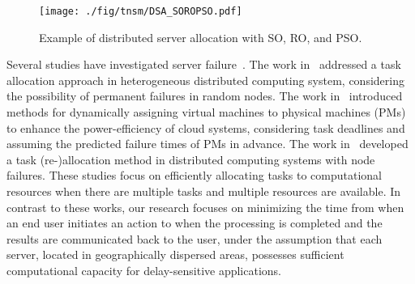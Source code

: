 \documentclass[10pt, letterpaper]{IEEEtran}
\begin{document}
\begin{CJK}{UTF8}{ipxm}
\begin{figure}[tb]
  \begin{center}
      \texttt{[image: ./fig/tnsm/DSA\_SOROPSO.pdf]}
  \end{center}
  \caption{Example of distributed server allocation with SO, RO, and PSO.}
  \label{fig:DSA_SOROPSO}
\end{figure}

Several studies have investigated server failure~\cite{ImanakaTNSM27,ImanakaTNSM28,ImanakaTNSM29}.
The work in~\cite{ImanakaTNSM27} addressed a task allocation approach in heterogeneous distributed computing system, considering the possibility of permanent failures in random nodes.
The work in~\cite{ImanakaTNSM28} introduced methods for dynamically assigning virtual machines to physical machines (PMs) to enhance the power-efficiency of cloud systems, considering task deadlines and assuming the predicted failure times of PMs in advance.
The work in~\cite{ImanakaTNSM29} developed a task (re-)allocation method in distributed computing systems with node failures.
% 
These studies focus on efficiently allocating tasks to computational resources when there are multiple tasks and multiple resources are available.
In contrast to these works, our research focuses on minimizing the time from when an end user initiates an action to when the processing is completed and the results are communicated back to the user, under the assumption that each server, located in geographically dispersed areas, possesses sufficient computational capacity for delay-sensitive applications.


\end{CJK}
\end{document}
